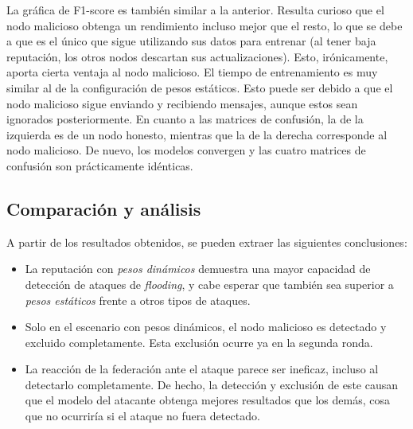 La gráfica de F1-score es también similar a la anterior. Resulta curioso que el nodo malicioso obtenga un rendimiento
incluso mejor que el resto, lo que se debe a que es el único que sigue utilizando sus datos para entrenar (al tener
baja reputación, los otros nodos descartan sus actualizaciones). Esto, irónicamente, aporta cierta ventaja al nodo malicioso. El tiempo de
entrenamiento es muy similar al de la configuración de pesos estáticos. Esto puede ser debido a que el nodo malicioso
sigue enviando y recibiendo mensajes, aunque estos sean ignorados posteriormente.
En cuanto a las matrices de confusión, la de la izquierda es de un nodo honesto, mientras que la de la derecha corresponde
al nodo malicioso. De nuevo, los modelos convergen y las cuatro matrices de confusión son prácticamente idénticas.

\subsection{Comparación y análisis}

A partir de los resultados obtenidos, se pueden extraer las siguientes conclusiones:

\begin{itemize}
    \item La reputación con \textit{pesos dinámicos} demuestra una mayor capacidad de detección de ataques de \textit{flooding}, y cabe esperar que también sea superior a \textit{pesos estáticos} frente a otros tipos de ataques.
    \item Solo en el escenario con pesos dinámicos, el nodo malicioso es detectado y excluido completamente. Esta exclusión ocurre ya en la segunda ronda.
    \item La reacción de la federación ante el ataque parece ser ineficaz, incluso al detectarlo completamente. De hecho, la detección y exclusión de este causan que el modelo del
    atacante obtenga mejores resultados que los demás, cosa que no ocurriría si el ataque no fuera detectado.
\end{itemize}


